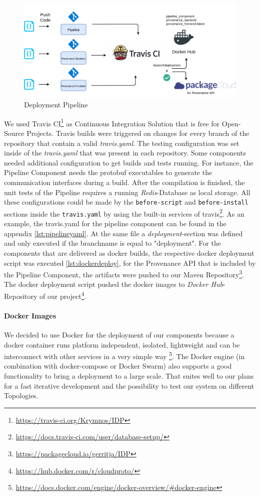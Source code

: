 \begin{figure}[h!]
	\includegraphics[width=\textwidth]{figures/deployment.png}
	\caption{Deployment Pipeline}
	\label{fig:deployment}
\end{figure}


We used Travis CI\footnote{\url{https://travis-ci.org/Krymnos/IDP}} as Continuous Integration Solution that is free for Open-Source Projects. Travis builds were triggered on changes for every branch of the repository that contain a valid \emph{travis.yaml}.
The testing configuration was set inside of the \emph{travis.yaml} that was present in each repository. Some components needed additional configuration to get builds and tests running. For instance, the Pipeline Component needs the protobuf executables to generate the communication interfaces during a build. After the compilation is finished, the unit tests of the Pipeline requires a running \emph{Redis}-Database as local storage. All these configurations could be made by the \texttt{before-script} and \texttt{before-install} sections inside the \texttt{travis.yaml} by using the built-in services of travis\footnote{\url{https://docs.travis-ci.com/user/database-setup/}}. As an example, the travis.yaml for the pipeline component can be found in the appendix \ref{lst:pipelineyaml}.
At the same file a \emph{deployment}-section was defined and only executed if the branchname is equal to "deployment". For the components that are delivered as docker builds, the respective docker deployment script was executed \ref{lst:dockerdeploy}, for the Provenance API that is included by the Pipeline Component, the artifacts were pushed to our Maven Repository\footnote{\url{https://packagecloud.io/gerritja/IDP}}. The docker deployment script pushed the docker images to \emph{Docker Hub}-Repository of our project\footnote{\url{https://hub.docker.com/r/cloudproto/}}.

\paragraph*{Docker Images}
We decided to use Docker for the deployment of our components because a docker container runs platform independent, isolated, lightweight and can be interconnect with other services in a very simple way \footnote{\url{https://docs.docker.com/engine/docker-overview/\#docker-engine}}. The Docker engine (in combination with docker-compose or Docker Swarm) also supports a good functionality to bring a deployment to a large scale. That suites well to our plans for a fast iterative development and the possibility to test our system on different Topologies.

